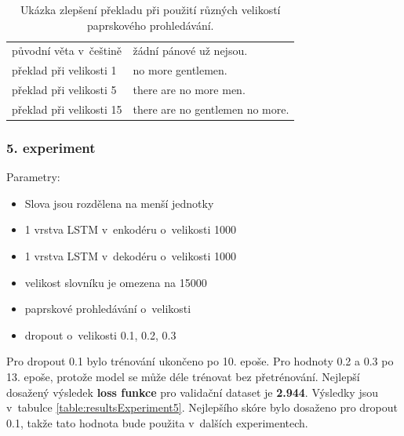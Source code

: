 \begin{table}[H]
    \begin{center}
        \begin{tabular}{ll}
          \toprule
          původní věta v~češtině & žádní pánové už nejsou. \\
          překlad při velikosti 1 & no more gentlemen. \\
          překlad při velikosti 5 & there are no more men. \\
          překlad při velikosti 15 & there are no gentlemen no more. \\
          \bottomrule
        \end{tabular}
    \end{center}
	\caption{Ukázka zlepšení překladu při použití různých velikostí paprskového prohledávání.}
	\label{table:beamTranslation}
\end{table}

\subsubsection{5. experiment}\label{experiment5}
Parametry:
\begin{itemize}
  \item Slova jsou rozdělena na menší jednotky
  \item 1 vrstva LSTM v~enkodéru o~velikosti 1000
  \item 1 vrstva LSTM v~dekodéru o~velikosti 1000
  \item velikost slovníku je omezena na 15000
  \item paprskové prohledávání o~velikosti
  \item dropout o~velikosti 0.1, 0.2, 0.3
\end{itemize}

 Pro dropout 0.1 bylo trénování ukončeno po 10. epoše. Pro hodnoty 0.2 a 0.3 po 13. epoše, protože model se může déle trénovat bez přetrénování. Nejlepší dosažený výsledek \textbf{loss funkce} pro validační dataset je \textbf{2.944}. Výsledky jsou v~tabulce \ref{table:resultsExperiment5}. Nejlepšího skóre bylo dosaženo pro dropout 0.1, takže tato hodnota bude použita v~dalších experimentech.

